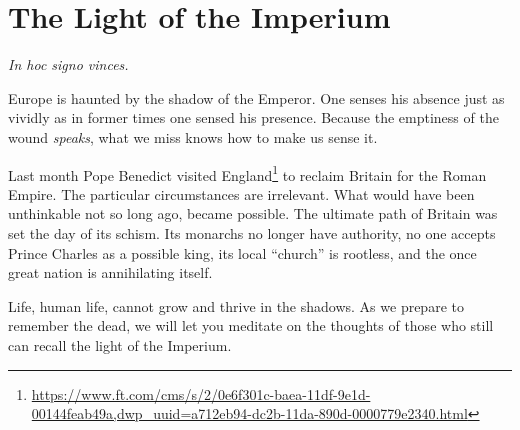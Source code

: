 \section{The Light of the Imperium}

\textit{In hoc signo vinces.}

\begin{quotex}
Europe is haunted by the shadow of the Emperor. One senses his absence just as vividly as in former times one sensed his presence. Because the emptiness of the wound \emph{speaks}, what we miss knows how to make us sense it.
\end{quotex}

Last month Pope Benedict visited England\footnote{\url{https://www.ft.com/cms/s/2/0e6f301c-baea-11df-9e1d-00144feab49a,dwp\_uuid=a712eb94-dc2b-11da-890d-0000779e2340.html}} to reclaim Britain for the Roman Empire. The particular circumstances are irrelevant. What would have been unthinkable not so long ago, became possible. The ultimate path of Britain was set the day of its schism. Its monarchs no longer have authority, no one accepts Prince Charles as a possible king, its local ``church'' is rootless, and the once great nation is annihilating itself.

Life, human life, cannot grow and thrive in the shadows. As we prepare to remember the dead, we will let you meditate on the thoughts of those who still can recall the light of the Imperium.

